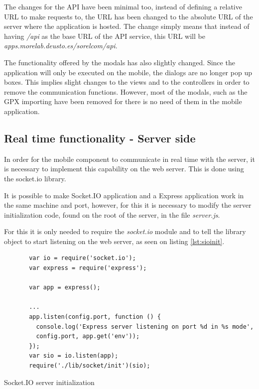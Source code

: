 The changes for the API have been minimal too, instead of defining a relative URL to make requests to, the URL has been changed to the absolute URL of the server where the application is hosted. The change simply means that instead of having \textit{/api} as the base URL of the API service, this URL will be \textit{apps.morelab.deusto.es/sorelcom/api}.

The functionality offered by the modals has also slightly changed. Since the application will only be executed on the mobile, the dialogs are no longer pop up boxes. This implies slight changes to the views and to the controllers in order to remove the communication functions. However, most of the modals, such as the GPX importing have been removed for there is no need of them in the mobile application.

\subsection{Real time functionality - Server side}

In order for the mobile component to communicate in real time with the server, it is necessary to implement this capability on the web server. This is done using the socket.io library.

It is possible to make Socket.IO application and a Express application work in the same machine and port, however, for this it is necessary to modify the server initialization code, found on the root of the server, in the file \textit{server.js}.

For this it is only needed to require the \textit{socket.io} module and to tell the library object to start listening on the web server, as seen on listing \ref{lst:sioinit}.

\begin{listing}[ht]\centering
  \begin{minipage}{.8\textwidth}
    \begin{verbatim}
       var io = require('socket.io');
       var express = require('express');
       
       var app = express();
       
       ...
       app.listen(config.port, function () {
         console.log('Express server listening on port %d in %s mode', 
         config.port, app.get('env'));
       });
       var sio = io.listen(app);
       require('./lib/socket/init')(sio);
    \end{verbatim}
  \end{minipage}
  \caption{Socket.IO server initialization}\label{lst:sioinit}
\end{listing}

